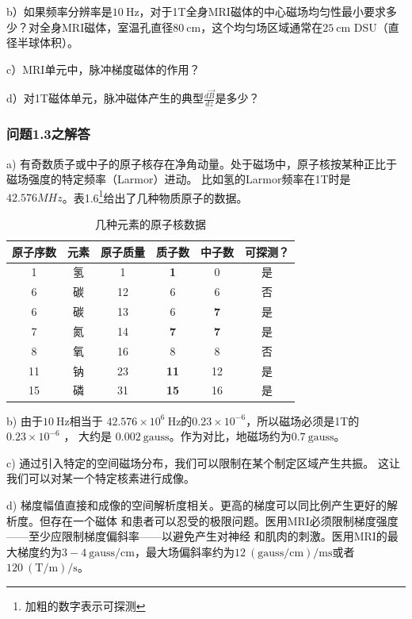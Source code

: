 b）如果频率分辨率是$10\ \mathrm{Hz}$，对于1T全身MRI磁体的中心磁场均匀性最小要求多少？对全身MRI磁体，室温孔直径$80\ \mathrm{cm}$，这个均匀场区域通常在$25\ \mathrm{cm}$ DSU（直径半球体积）。

c）MRI单元中，脉冲梯度磁体的作用？

d）对1T磁体单元，脉冲磁体产生的典型$\frac{d\vec{B}}{dz}$是多少？

\subsubsection{问题1.3之解答}
a) 有奇数质子或中子的原子核存在净角动量。处于磁场中，原子核按某种正比于磁场强度的特定频率（Larmor）进动。
比如氢的Larmor频率在1T时是$42.576MHz$。表1.6\footnote{加粗的数字表示可探测}给出了几种物质原子的数据。
\begin{table}[htbp]\small
  \centering
  \caption{几种元素的原子核数据} \label{tb:atomic}
\begin{tabular}{|c||c|c|c|c|c|}
  \hline
原子序数&元素&原子质量&质子数&中子数&可探测？ \\ \hline \hline
1&氢&1&\textbf{1}&0&是 \\ \hline
6&碳&12&6&6&否 \\ \hline
6&碳&13&6&\textbf{7}&是 \\ \hline
7&氮&14&\textbf{7}&\textbf{7}&是 \\ \hline
8&氧&16&8&8&否 \\ \hline
11&钠&23&\textbf{11}&12&是 \\ \hline
15&磷&31&\textbf{15}&16&是 \\ \hline
\end{tabular}
\end{table}

b) 由于$10\ \mathrm{Hz}$相当于 $42.576×10^6\ \mathrm{Hz}$的$0.23×10^{−6}$，所以磁场必须是1T的$0.23×10^{−6}$ ，
大约是 $0.002\ \mathrm{gauss}$。作为对比，地磁场约为$0.7 \ \mathrm{gauss}$。

c) 通过引入特定的空间磁场分布，我们可以限制在某个制定区域产生共振。
这让我们可以对某一个特定核素进行成像。

d) 梯度幅值直接和成像的空间解析度相关。更高的梯度可以同比例产生更好的解析度。但存在一个磁体
和患者可以忍受的极限问题。医用MRI必须限制梯度强度——至少应限制梯度偏斜率——以避免产生对神经
和肌肉的刺激。医用MRI的最大梯度约为$3-4 \ \mathrm{gauss/cm}$，最大场偏斜率约为$12\ \mathrm{(gauss/cm)/ms}$或者
$120\ \mathrm{(T/m)/s}$。

